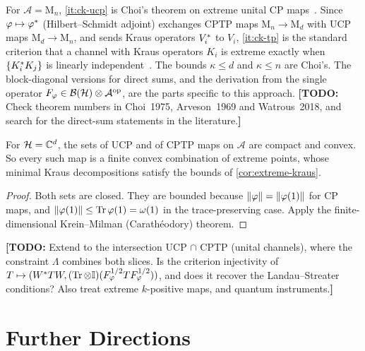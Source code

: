 \documentclass[12pt]{article}
\newcommand{\todo}[1]{\textcolor{\mysubcolor}{\small\textbf{[TODO:} #1\textbf{]}}}
\newcommand{\alg}{\mathcal{A}}             %
\newcommand{\hilb}{\mathcal{H}}            %
\newcommand{\bdd}[1]{\mathcal{B}\br{#1}}   %
\newcommand{\Mn}[1]{\mathrm{M}_{#1}}       %
\newcommand{\op}{^{\mathrm{op}}}           %
\newcommand{\Fphi}{F_{\varphi}}
\begin{document}
\begin{remark}
\label{rem:extreme-lit}
For \(\alg = \Mn n\), \ref{it:ck-ucp} is Choi's theorem on extreme unital CP
maps~\cite[Theorem~5]{Choi1975}. Since \(\varphi \mapsto \varphi^*\)
(Hilbert--Schmidt adjoint) exchanges CPTP maps \(\Mn n \to \Mn d\) with UCP maps
\(\Mn d \to \Mn n\), and sends Kraus operators \(V_i^*\) to \(V_i\),
\ref{it:ck-tp} is the standard criterion that a channel with Kraus operators
\(K_i\) is extreme exactly when \(\left\{ K_i^* K_j \right\}\) is linearly
independent~\cite{Watrous2018}. The bounds \(\kappa \le d\) and \(\kappa \le n\) are
Choi's. The block-diagonal versions for direct sums, and the derivation from the
single operator \(\Fphi \in \bdd\hilb \tensor \alg\op\), are the parts specific to
this approach. \todo{Check theorem numbers in Choi~1975, Arveson~1969 and
Watrous~2018, and search for the direct-sum statements in the literature.}
\end{remark}

\begin{corollary}
\label{cor:krein-milman}
For \(\hilb = \complex^d\), the sets of UCP and of CPTP maps on \(\alg\) are compact
and convex. So every such map is a finite convex combination of extreme points,
whose minimal Kraus decompositions satisfy the bounds of
\cref{cor:extreme-kraus}.
\end{corollary}
\begin{proof}
Both sets are closed. They are bounded because \(\left\| \varphi \right\| = \left\| \varphi(1) \right\|\)
for CP maps, and \(\left\| \varphi(1) \right\| \le \operatorname{Tr}\varphi(1) = \omega(1)\) in the
trace-preserving case. Apply the finite-dimensional Krein--Milman (Carath\'eodory)
theorem.
\end{proof}

\todo{Extend to the intersection UCP \(\cap\) CPTP (unital channels), where the
constraint \(\Lambda\) combines both slices. Is the criterion injectivity of
\(T \mapsto (W^\adjoint TW, (\trace \tensor \id)(\Fphi^{1/2}T\Fphi^{1/2}))\), and
does it recover the Landau--Streater conditions? Also treat extreme
\(k\)-positive maps, and quantum instruments.}

\section{Further Directions}
\label{sec:further}
\end{document}
